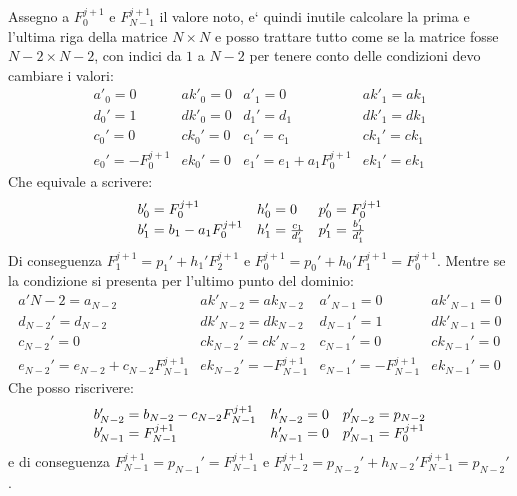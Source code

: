 \documentclass[]{article}
\numberwithin{equation}{subsection}
\begin{document}
Assegno a $F_0^{j+1}$ e $F_{N-1}^{j+1}$ il valore noto, e` quindi inutile calcolare la prima e l'ultima riga della matrice $N\times N$ e posso trattare tutto come se la matrice fosse $N-2\times N-2$, con indici da $1$ a $N-2$ per tenere conto delle condizioni devo cambiare i valori:
\begin{equation}
\begin{array}{ll|ll}
	a'_0 = 0 & ak'_0= 0&	a'_1 = 0 & ak'_1= ak_1\\
	d_0' = 1& dk'_0 = 0&	d_1' = d_1& dk'_1 = dk_1\\
	c_0' =  0& ck_0' = 0&	c_1' =  c_1& ck_1' = ck_1\\
	e_0' = -F_0^{j+1} & ek_0' = 0&	e_1' = e_1+a_1 F^{j+1}_0 & ek_1' = ek_1
\end{array}
\end{equation}
Che equivale  a scrivere:
\begin{equation}
\begin{array}{l l l}
b_0' = F_0^{j+1}&h_0' = 0&p_0' = F_0^{j+1}\\
b_1' = b_1 - a_1 F_0^{j+1}  &h_1' = \frac{c_1}{d_1'}&p_1' = \frac{b_1'}{d_1'}
\end{array}
\end{equation}
Di conseguenza $F_1^{j+1} = p_1' + h_1'F_2^{j+1}$ e $F_0^{j+1} = p_0' + h_0' F_1^{j+1} = F_0^{j+1}$. Mentre se la condizione si presenta per l'ultimo punto del dominio:
\begin{equation}
\begin{array}{ll|ll}
a'{N-2} = a_{N-2} & ak'_{N-2}= ak_{N-2} &	a'_{N-1} = 0 & ak'_{N-1}= 0\\
d_{N-2}' = d_{N-2}& dk'_{N-2} = dk_{N-2}&	d_{N-1}' = 1& dk'_{N-1} = 0\\
c_{N-2}' =  0& ck_{N-2}' = ck'_{N-2}	&	c_{N-1}' =  0& ck_{N-1}' = 0\\
e_{N-2}' = e_{N-2}+c_{N-2}F_{N-1}^{j+1} & ek_{N-2}' = - F^{j+1}_{N-1}&	e_{N-1}' =  -F^{j+1}_{N-1} & ek_{N-1}' = 0
\end{array}
\end{equation}
Che posso riscrivere:
\begin{equation}
\begin{array}{l l l}
b_{N-2}' = b_{N-2} - c_{N-2} F_{N-1}^{j+1}  &h_{N-2}' = 0&p_{N-2}' = p_{N-2}\\
b_{N-1}' = F_{N-1}^{j+1}&h_{N-1}' = 0&p_{N-1}' = F_0^{j+1}
\end{array}
\end{equation}
e di conseguenza $F_{N-1}^{j+1} = p_{N-1}' = F_{N-1}^{j+1}$ e $F_{N-2}^{j+1} = p_{N-2}'+h_{N-2}' F_{N-1}^{j+1} =  p_{N-2}'$.
\end{document}
